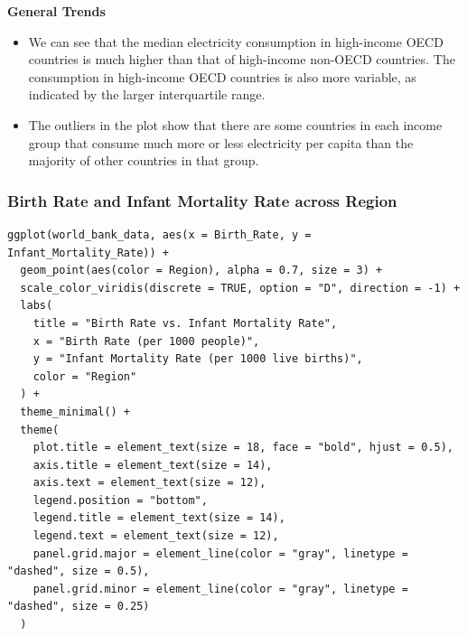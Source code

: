 \documentclass{article}\usepackage[]{graphicx}\usepackage[]{xcolor}
\begin{document}
\textbf{General Trends}
\begin{itemize}
\item{We can see that the median electricity consumption in high-income OECD countries is much higher than that of high-income non-OECD countries. The consumption in high-income OECD countries is also more variable, as indicated by the larger interquartile range.}

\item{The outliers in the plot show that there are some countries in each income group that consume much more or less electricity per capita than the majority of other countries in that group.}
\end{itemize}
\newpage
\subsubsection{Birth Rate and Infant Mortality Rate across Region}
\begin{lstlisting}
ggplot(world_bank_data, aes(x = Birth_Rate, y = Infant_Mortality_Rate)) +
  geom_point(aes(color = Region), alpha = 0.7, size = 3) +
  scale_color_viridis(discrete = TRUE, option = "D", direction = -1) +  
  labs(
    title = "Birth Rate vs. Infant Mortality Rate",
    x = "Birth Rate (per 1000 people)",
    y = "Infant Mortality Rate (per 1000 live births)",
    color = "Region"
  ) +
  theme_minimal() +
  theme(
    plot.title = element_text(size = 18, face = "bold", hjust = 0.5),
    axis.title = element_text(size = 14),
    axis.text = element_text(size = 12),
    legend.position = "bottom",
    legend.title = element_text(size = 14),
    legend.text = element_text(size = 12),
    panel.grid.major = element_line(color = "gray", linetype = "dashed", size = 0.5),
    panel.grid.minor = element_line(color = "gray", linetype = "dashed", size = 0.25)
  )



\end{lstlisting}
\newpage
\end{document}
